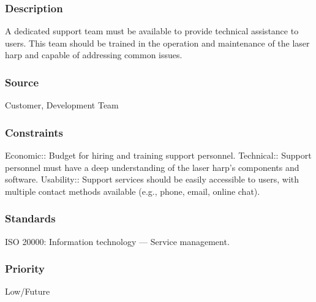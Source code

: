 \subsubsection{Description}
A dedicated support team must be available to provide technical assistance to users. This team should be trained in the operation and maintenance of the laser harp and capable of addressing common issues.
\subsubsection{Source}
Customer, Development Team
\subsubsection{Constraints}
Economic:: Budget for hiring and training support personnel.
Technical:: Support personnel must have a deep understanding of the laser harp's components and software.
Usability:: Support services should be easily accessible to users, with multiple contact methods available (e.g., phone, email, online chat).
\subsubsection{Standards}
ISO 20000: Information technology — Service management.
\subsubsection{Priority}
Low/Future
